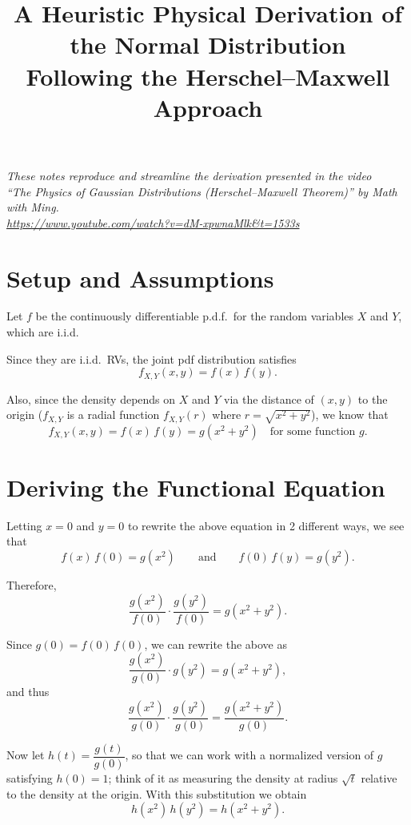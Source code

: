 \documentclass[12pt]{article}
\title{\textbf{A Heuristic Physical Derivation of the Normal Distribution}\\[0.5em]
\large Following the Herschel--Maxwell Approach}
\author{}
\date{}
\begin{document}
 
\maketitle
 
\begin{center}
\small\textit{These notes reproduce and streamline the derivation presented in the video \\ 
``The Physics of Gaussian Distributions (Herschel--Maxwell Theorem)'' by Math with Ming.\\
\url{https://www.youtube.com/watch?v=dM-xpwnaMlk&t=1533s}}
\end{center}
 
\bigskip
 
\bigskip
 
\section*{Setup and Assumptions}
 
Let $f$ be the continuously differentiable p.d.f.\ for the random variables $X$ and $Y$, which are i.i.d.
 
Since they are i.i.d.\ RVs, the joint pdf distribution satisfies
\[
    f_{X,Y}(x, y) = f(x)\, f(y).
\]
 
Also, since the density depends on $X$ and $Y$ via the distance of $(x, y)$ to the origin ($f_{X,Y}$ is a radial function $f_{X,Y}(r)$ where $r = \sqrt{x^2 + y^2}$), we know that
\[
    f_{X,Y}(x, y) = f(x)\,f(y) = g(x^2 + y^2) \quad \text{for some function } g.
\]
 
\section*{Deriving the Functional Equation}
 
Letting $x = 0$ and $y = 0$ to rewrite the above equation in 2 different ways, we see that
\[
    f(x)\,f(0) = g(x^2) \qquad \text{and} \qquad f(0)\,f(y) = g(y^2).
\]
 
Therefore,
\[
    \frac{g(x^2)}{f(0)} \cdot \frac{g(y^2)}{f(0)} = g(x^2 + y^2).
\]
 
Since $g(0) = f(0)\,f(0)$, we can rewrite the above as
\[
    \frac{g(x^2)}{g(0)}\cdot g(y^2) = g(x^2 + y^2),
\]
and thus
\[
    \frac{g(x^2)}{g(0)} \cdot \frac{g(y^2)}{g(0)} = \frac{g(x^2 + y^2)}{g(0)}.
\]
 
Now let $h(t) = \dfrac{g(t)}{g(0)}$, so that we can work with a normalized version of $g$ satisfying $h(0) = 1$; think of it as measuring the density at radius $\sqrt{t}$ relative to the density at the origin. With this substitution we obtain
\[
    h(x^2)\,h(y^2) = h(x^2 + y^2).
\]
 
\end{document}
